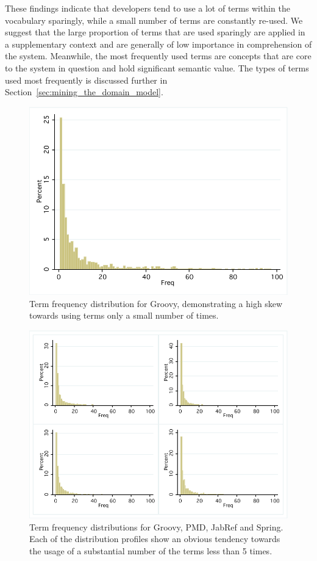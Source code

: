 These findings indicate that developers tend to use a lot of terms within the vocabulary sparingly, while a small number of terms are constantly re-used. We suggest that the large proportion of terms that are used sparingly are applied in a supplementary context and are generally of low importance in comprehension of the system. Meanwhile, the most frequently used terms are concepts that are core to the system in question and hold significant semantic value. The types of terms used most frequently is discussed further in Section~\ref{sec:mining_the_domain_model}.

\begin{figure}[t]
\centering
\includegraphics[width=\textwidth]{Figures/Vocab-GroovyFreqDist.pdf}
\caption{Term frequency distribution for Groovy, demonstrating a high skew towards using terms only a small number of times.}
\label{fig:vocab-freq-dist-groovy}
\end{figure}

\begin{figure}[t]
\centering
\includegraphics[width=\textwidth]{Figures/Vocab-FrequencyDistComparison.pdf}
\caption{Term frequency distributions for Groovy, PMD, JabRef and Spring. Each of the distribution profiles show an obvious tendency towards the usage of a substantial number of the terms less than 5 times.}
\label{fig:vocab-freq-dist-comparison}
\end{figure}

